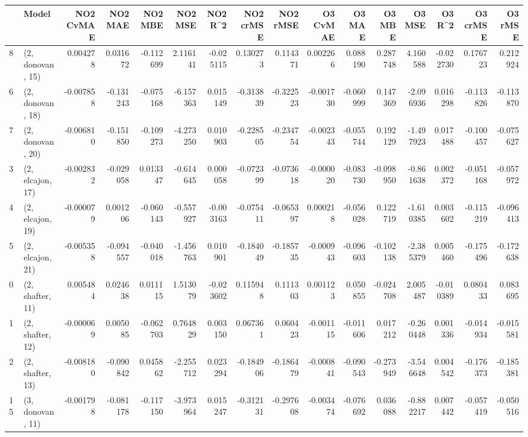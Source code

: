 \begin{tabular}{llrrrrrrrrrrrrrr}
\toprule
{} &             Model &  NO2 CvMAE &   NO2 MAE &   NO2 MBE &    NO2 MSE &   NO2 R\textasciicircum2 &  NO2 crMSE &  NO2 rMSE &  O3 CvMAE &    O3 MAE &    O3 MBE &     O3 MSE &    O3 R\textasciicircum2 &  O3 crMSE &   O3 rMSE \\
\midrule
8  &  (2, donovan, 15) &   0.004278 &  0.031672 & -0.112699 &   2.116141 & -0.025115 &   0.130273 &  0.114371 &  0.002266 &  0.088190 &  0.287748 &   4.160588 & -0.022730 &  0.176723 &  0.212924 \\
6  &  (2, donovan, 18) &  -0.007858 & -0.131243 & -0.075168 &  -6.157363 &  0.015149 &  -0.313839 & -0.322523 & -0.001730 & -0.060999 &  0.147369 &  -2.096936 &  0.016298 & -0.113826 & -0.113870 \\
7  &  (2, donovan, 20) &  -0.006810 & -0.151850 & -0.109273 &  -4.273250 &  0.010903 &  -0.228505 & -0.234754 & -0.002343 & -0.055744 &  0.192129 &  -1.497923 &  0.017488 & -0.100457 & -0.075627 \\
3  &  (2, elcajon, 17) &  -0.002832 & -0.029058 &  0.013347 &  -0.614645 &  0.000058 &  -0.072399 & -0.073618 & -0.000020 & -0.083730 & -0.098950 &  -0.861638 &  0.002372 & -0.051168 & -0.057972 \\
4  &  (2, elcajon, 19) &  -0.000079 &  0.001206 & -0.060143 &  -0.557927 & -0.003163 &  -0.075411 & -0.065397 &  0.000218 & -0.056028 &  0.122719 &  -1.610385 &  0.003602 & -0.115219 & -0.096413 \\
5  &  (2, elcajon, 21) &  -0.005358 & -0.094557 & -0.040018 &  -1.456763 &  0.010901 &  -0.184049 & -0.185735 & -0.000943 & -0.096603 & -0.102138 &  -2.385379 &  0.005460 & -0.175496 & -0.172638 \\
0  &  (2, shafter, 11) &   0.005484 &  0.024638 &  0.011115 &   1.513079 & -0.023602 &   0.115948 &  0.111303 &  0.001123 &  0.050855 & -0.024708 &   2.005487 & -0.010389 &  0.080433 &  0.083695 \\
1  &  (2, shafter, 12) &  -0.000069 &  0.005085 & -0.062703 &   0.764829 &  0.003150 &   0.067361 &  0.060423 & -0.001115 & -0.011606 &  0.017212 &  -0.260448 &  0.001336 & -0.014934 & -0.015581 \\
2  &  (2, shafter, 13) &  -0.008180 & -0.090842 &  0.045862 &  -2.255712 &  0.023294 &  -0.184906 & -0.186479 & -0.000841 & -0.090543 & -0.273949 &  -3.546648 &  0.004542 & -0.176373 & -0.185381 \\
15 &  (3, donovan, 11) &  -0.001798 & -0.081178 & -0.117150 &  -3.973964 &  0.015247 &  -0.312131 & -0.297608 & -0.003474 & -0.076692 &  0.036088 &  -0.882217 &  0.007442 & -0.057419 & -0.050516 \\

\end{tabular}
